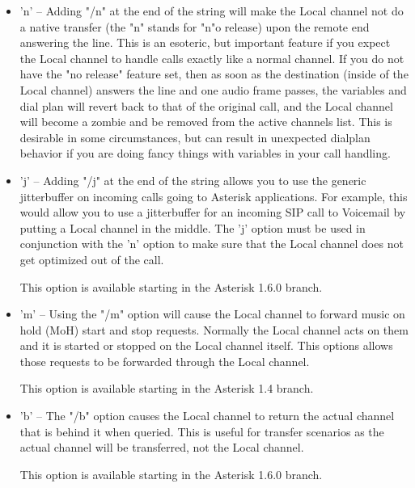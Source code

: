 \begin{itemize}
\item 'n' -- Adding "/n" at the end of the string will make the Local channel not 
          do a native transfer (the "n" stands for "n"o release) upon the remote
          end answering the line. This is an esoteric, but important feature if
          you expect the Local channel to handle calls exactly like a normal
          channel. If you do not have the "no release" feature set, then as soon
          as the destination (inside of the Local channel) answers the line and
          one audio frame passes, the variables and dial plan will revert back
          to that of the original call, and the Local channel will become a
          zombie and be removed from the active channels list. This is desirable
          in some circumstances, but can result in unexpected dialplan behavior
          if you are doing fancy things with variables in your call handling.

\item 'j' -- Adding "/j" at the end of the string allows you to use the generic
          jitterbuffer on incoming calls going to Asterisk applications. For 
          example, this would allow you to use a jitterbuffer for an incoming
          SIP call to Voicemail by putting a Local channel in the middle. The 
          'j' option must be used in conjunction with the 'n' option to make
          sure that the Local channel does not get optimized out of the call.

          This option is available starting in the Asterisk 1.6.0 branch.

\item 'm' -- Using the "/m" option will cause the Local channel to forward music on
          hold (MoH) start and stop requests. Normally the Local channel acts on
          them and it is started or stopped on the Local channel itself. This
          options allows those requests to be forwarded through the Local
          channel.

          This option is available starting in the Asterisk 1.4 branch.

\item 'b' -- The "/b" option causes the Local channel to return the actual channel
          that is behind it when queried. This is useful for transfer scenarios
          as the actual channel will be transferred, not the Local channel.

          This option is available starting in the Asterisk 1.6.0 branch.
\end{itemize}
